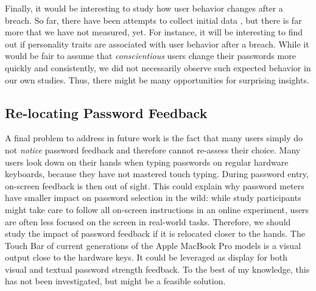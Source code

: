 Finally, it would be interesting to study how user behavior changes after a breach. So far, there have been attempts to collect initial data \cite{Huh2017TooBusy}, but there is far more that we have not measured, yet. For instance, it will be interesting to find out if personality traits are associated with user behavior after a breach. While it would be fair to assume that \textit{conscientious} users change their passwords more quickly and consistently, we did not necessarily observe such expected behavior in our own studies. Thus, there might be many opportunities for surprising insights.

\subsection{Re-locating Password Feedback} 
A final problem to address in future work is the fact that many users simply do not \textit{notice} password feedback and therefore cannot re-assess their choice. 
Many users look down on their hands when typing passwords on regular hardware keyboards, because they have not mastered touch typing. During password entry, on-screen feedback is then out of sight. 
This could explain why password meters have smaller impact on password selection in the wild: while study participants might take care to follow all on-screen instructions in an online experiment, users are often less focused on the screen in real-world tasks. 
Therefore, we should study the impact of password feedback if it is relocated closer to the hands. 
The Touch Bar of current generations of the Apple MacBook Pro models is a visual output close to the hardware keys. It could be leveraged as display for both visual and textual password strength feedback. 
To the best of my knowledge, this has not been investigated, but might be a feasible solution. 




